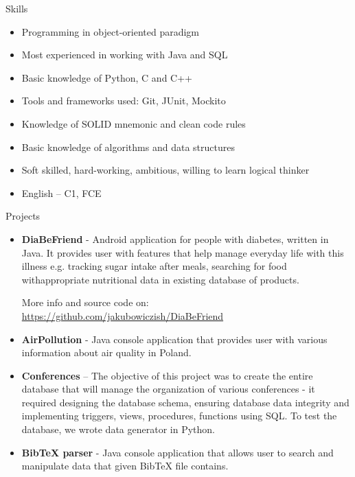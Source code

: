 \documentclass{resume} %
\begin{document}
\begin{rSection}{Skills}
\begin{itemize}
 \setlength\itemsep{-0.5em}
\item Programming in object-oriented paradigm
\item Most experienced in working with Java and SQL
\item Basic knowledge of Python, C and C++
\item Tools and frameworks used: Git, JUnit, Mockito
\item Knowledge of SOLID mnemonic and clean code rules
\item Basic knowledge of algorithms and data structures
\item Soft skilled, hard-working, ambitious, willing to learn logical thinker
\item English – C1, FCE
\end{itemize}
\end{rSection}



\begin{rSection}{Projects}
\begin{itemize} 
 \setlength\itemsep{0em}
\item \textbf{DiaBeFriend} - Android application for people with diabetes, written in Java. 
It provides user with features that
help manage everyday life with this illness e.g. tracking sugar intake after meals, searching for food withappropriate nutritional data in existing database of products.

 More info and source code on: \url{https://github.com/jakubowiczish/DiaBeFriend}

\item \textbf{AirPollution} - Java console application that provides user with various information about air quality in Poland.

\item \textbf{Conferences} – The objective of this project was to create the entire database that will manage the organization
of various conferences - it required designing the database schema, ensuring database data integrity and
implementing triggers, views, procedures, functions using SQL. To test the database, we wrote data generator in
Python.

\item \textbf{BibTeX parser} - Java console application that allows user to search and manipulate data that given BibTeX file
contains.
\end{itemize}
\end{rSection}
\end{document}
